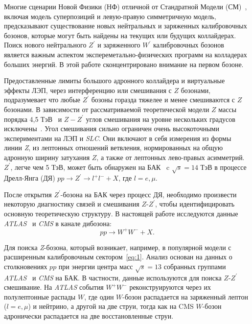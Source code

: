 Многие сценарии Новой Физики (НФ) отличной от Стандратной Модели (СМ)~\cite{2part-1}, включая модель суперпозиций и левую-правую симметричную модель, предсказывают существование новых нейтральных и заряженных калибровочных бозонов, которые могут быть найдены на текущих или будущих коллайдерах. Поиск нового нейтрального $Z^\prime$ и заряженного $W^\prime$ калибровочных бозонов является важным аспектом экспереметально-физических программ на колладерах больших энергий. В этой работе сконцентрировано внимание на первом бозоне.

Предоставленные лимиты большого адронного коллайдера и виртуальные эффекты ЛЭП, через интерференцию или смешивания с $Z$ бозонами, подразумевает что любые $Z^\prime$ бозоны горазда тяжелее и менее смешиваются с $Z$ бозонами. В зависимости от рассматриваемой теоретической модели $Z$ массы порядка 4,5 ТэВ~\cite{2part-pankov} и $Z-Z^\prime$ углов смешивания на уровне нескольких градусов исключены~\cite{sirunyan:2017}. Угол смешивания сильно ограничен очень высокоточными экспериментами на ЛЭП и \textit{SLC}. Они включают в себя измерения из формы линии \textit{Z}, из лептонных отношений ветвления, нормированных на общую адронную ширину затухания $Z$, а также от лептонных лево-правых асимметрий. $Z^\prime$, легче чем 5 ТэВ, может быть обнаружен на БАК~\cite{sirunyan:2017} c $\sqrt{s} = 14 $ ТэВ в процессе Дрелл-Янга (ДЯ) $pp \rightarrow Z^\prime \rightarrow l^+l^- + X$, где $l=e,\mu$.

После открытия $Z^\prime$-бозона на БАК через процесс ДЯ, необходимо произвести некоторую диагностику связей и смешивания $Z$-$Z^\prime$, чтобы идентифицировать основную теоретическую структуру. В настоящей работе исследуются данные \textit{ATLAS}~\cite{main-book} и \textit{CMS} в канале дибозона:
\begin{equation} \label{eq:1}
pp \rightarrow W^+W^- + X.
\end{equation}

Для поиска \textit{Z}-бозона, который возникает, например, в популярной модели с расширенным калибровочным сектором~\ref{eq:1}. Анализ основан на данных о столкновениях $pp$ при энергии центра масс $\sqrt{s} = 13 $ собранных группами \textit{ATLAS}~\cite{main-book} и \textit{CMS} на БАК. В частности, данные используются для поиска $Z$-$Z^\prime$ смешивание. На \textit{ATLAS} события $W^+W^-$ реконструируются через их полулептонные распады $W$, где один $W$-бозон распадается на заряженный лептон ($l=e,\mu$) и нейтрино, а другой на две струи, тогда как на CMS $W$-бозон адронически распадается на две восстановленные струи. 

